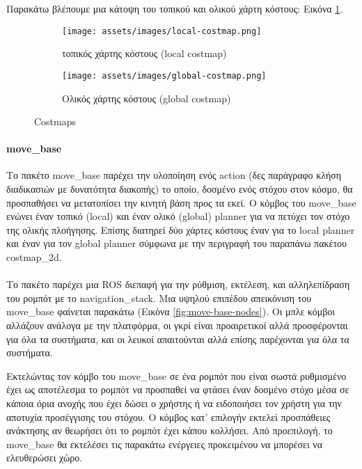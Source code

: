 Παρακάτω βλέπουμε μια κάτοψη του τοπικού και ολικού χάρτη κόστους: Εικόνα \ref{fig:costmaps}.

\begin{figure}[!h]
	\centering
	\begin{subfigure}{0.49\textwidth}
		\texttt{[image: assets/images/local-costmap.png]}
		\caption{τοπικός χάρτης κόστους (local costmap)}
	\end{subfigure}%
	\begin{subfigure}{0.49\textwidth}
		\texttt{[image: assets/images/global-costmap.png]}
		\caption{Ολικός χάρτης κόστους (global costmap)}
	\end{subfigure}
	\caption{Costmaps}
	\label{fig:costmaps}
\end{figure}

\paragraph{move\_base}

Το πακέτο move\_base παρέχει την υλοποίηση ενός action (δες παράγραφο κλήση διαδικασιών με δυνατότητα διακοπής) το οποίο, δοσμένο ενός στόχου στον κόσμο, θα προσπαθήσει να μετατοπίσει την κινητή βάση προς τα εκεί. Ο κόμβος του move\_base ενώνει έναν τοπικό (local) και έναν ολικό (global) planner για να πετύχει τον στόχο της ολικής πλοήγησης. Επίσης διατηρεί δύο χάρτες κόστους έναν για το local planner και έναν για τον global planner σύμφωνα με την περιγραφή του παραπάνω πακέτου costmap\_2d. \\
\\
Το πακέτο παρέχει μια ROS διεπαφή για την ρύθμιση, εκτέλεση, και αλληλεπίδραση του ρομπότ με το navigation\_stack. Μια υψηλού επιπέδου απεικόνιση του move\_base φαίνεται παρακάτω (Εικόνα \ref{fig:move-base-nodes}). Οι μπλε κόμβοι αλλάζουν ανάλογα με την πλατφόρμα, οι γκρί είναι προαιρετικοί αλλά προσφέρονται για όλα τα συστήματα, και οι λευκοί απαιτούνται αλλά επίσης παρέχονται για όλα τα συστήματα. 

Εκτελώντας τον κόμβο του move\_base σε ένα ρομπότ που είναι σωστά ρυθμισμένο έχει ως αποτέλεσμα το ρομπότ να προσπαθεί να φτάσει έναν δοσμένο στόχο μέσα σε κάποια όρια ανοχής που έχει δώσει ο χρήστης ή να ειδοποιήσει τον χρήστη για την αποτυχία προσέγγισης του στόχου. Ο κόμβος κατ' επιλογήν εκτελεί προσπάθειες ανάκτησης αν θεωρήσει ότι το ρομπότ έχει κάπου κολλήσει. Από προεπιλογή, το move\_base θα εκτελέσει τις παρακάτω ενέργειες προκειμένου να μπορέσει να ελευθερώσει χώρο. \\

